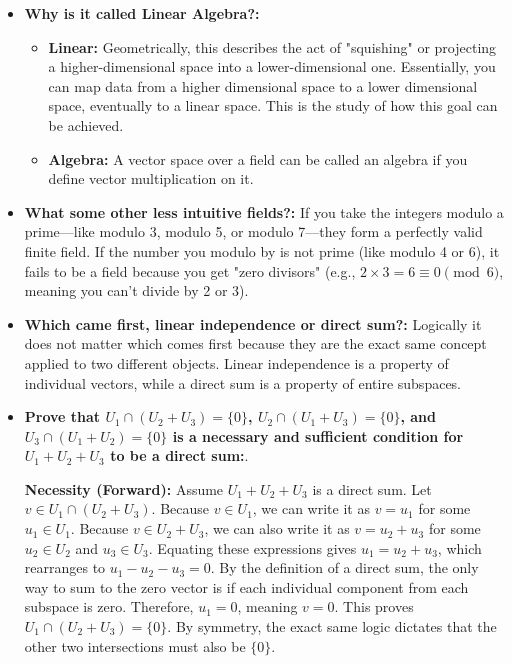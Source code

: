 \begin{tcolorbox}[colback=blue!5!white, colframe=blue!75!black, title=Extra Stuff]
	\begin{itemize}
		\item \textbf{Why is it called Linear Algebra?:} 
		\begin{itemize}
			\item \textbf{Linear:} Geometrically, this describes the act of "squishing" or projecting a higher-dimensional space into a lower-dimensional one. Essentially, you can map data from a higher dimensional space to a lower dimensional space, eventually to a linear space. This is the study of how this goal can be achieved.
			\item \textbf{Algebra:} A vector space over a field can be called an algebra if you define vector multiplication on it.
		\end{itemize}
		\item \textbf{What some other less intuitive fields?:} If you take the integers modulo a prime—like modulo 3, modulo 5, or modulo 7—they form a perfectly valid finite field. If the number you modulo by is not prime (like modulo 4 or 6), it fails to be a field because you get "zero divisors" (e.g., $2 \times 3 = 6 \equiv 0 \pmod 6$, meaning you can't divide by 2 or 3).
		\item \textbf{Which came first, linear independence or direct sum?:}
		Logically it does not matter which comes first because they are the exact same concept applied to two different objects. Linear independence is a property of individual vectors, while a direct sum is a property of entire subspaces.
		\item
		\textbf{Prove that $U_1 \cap (U_2 + U_3) = \{0\}$, $U_2 \cap (U_1 + U_3) = \{0\}$, and $U_3 \cap (U_1 + U_2) = \{0\}$ is a necessary and sufficient condition for $U_1 + U_2 + U_3$ to be a direct sum:}. 
		
		\textbf{Necessity (Forward):} Assume $U_1 + U_2 + U_3$ is a direct sum. Let $v \in U_1 \cap (U_2 + U_3)$. Because $v \in U_1$, we can write it as $v = u_1$ for some $u_1 \in U_1$. Because $v \in U_2 + U_3$, we can also write it as $v = u_2 + u_3$ for some $u_2 \in U_2$ and $u_3 \in U_3$. Equating these expressions gives $u_1 = u_2 + u_3$, which rearranges to $u_1 - u_2 - u_3 = 0$. By the definition of a direct sum, the only way to sum to the zero vector is if each individual component from each subspace is zero. Therefore, $u_1 = 0$, meaning $v = 0$. This proves $U_1 \cap (U_2 + U_3) = \{0\}$. By symmetry, the exact same logic dictates that the other two intersections must also be $\{0\}$.
		

\end{itemize}
\end{tcolorbox}
